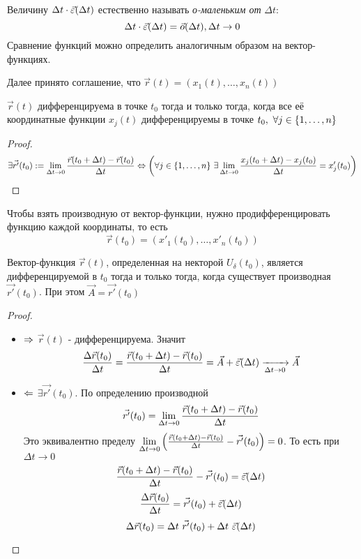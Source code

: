 \begin{note}
	Величину $\Delta t \cdot \vec{\varepsilon}(\Delta t)$ естественно называть \textit{о-маленьким от} $\Delta t$:
	\[
	\Delta t \cdot \vec{\varepsilon}(\Delta t) = \vec{o}(\Delta t), \Delta t \to 0
	\]
	Сравнение функций можно определить аналогичным образом на вектор-функциях.
\end{note}

\begin{note}
	Далее принято соглашение, что
	$\vec{r}(t) = (x_1(t), \ldots, x_n(t))$
\end{note}

\begin{lemma}
	$\vec{r}(t)$ дифференцируема в точке $t_0$
	тогда и только тогда, когда все её координатные
	функции $x_j(t)$ дифференцируемы в точке $t_0,\ 
	\forall j \in \range{n}$
\end{lemma}

\begin{proof}
	\[
		\exists \vec{r'}(t_0) := \lim\limits_{\Delta t \to 0}
		\frac{\vec{r}(t_0 + \Delta t) - \vec{r}(t_0)}{\Delta t}
		\Leftrightarrow \left(\forall j \in \{1, \ldots, n\}\ \exists
		\lim\limits_{\Delta t \to 0} \frac{x_j(t_0 + \Delta t) -
		x_j(t_0)}{\Delta t} = x'_j(t_0)\right)
	\]
\end{proof}

\begin{corollary}
	Чтобы взять производную от вектор-функции, нужно продифференцировать функцию каждой координаты, то есть
	\[
		\vec{r}(t_0) = (x'_1(t_0), \ldots, x'_n(t_0))
	\]
\end{corollary}

\begin{lemma}
	Вектор-функция $\vec{r}(t)$, определенная
	на некторой $U_\delta(t_0)$, является дифференцируемой
	в $t_0$ тогда и только тогда,
	когда существует производная $\vec{r'}(t_0)$.
	При этом $\vec{A} = \vec{r'}(t_0)$
\end{lemma}

\begin{proof}~
\begin{itemize}
	\item $\Rightarrow$ $\vec{r}(t)$ - дифференцируема. Значит
	\[
		\frac{\Delta\vec{r}(t_0)}{\Delta t} = \frac{\vec{r}(t_0 + \Delta t) - \vec{r}(t_0)}{\Delta t} = \vec{A} + \vec{\varepsilon}(\Delta t) \xrightarrow[\Delta t \to 0]{} \vec{A}
	\]
	
	\item $\Leftarrow$ $\exists \vec{r'}(t_0)$. По определению производной
	\[
		\vec{r'}(t_0) = \lim\limits_{\Delta t \to 0} \frac{\vec{r}(t_0 + \Delta t) - \vec{r}(t_0)}{\Delta t}
	\]
	Это эквивалентно пределу $\lim\limits_{\Delta t \to 0} \left(\frac{\vec{r}(t_0 + \Delta t) - \vec{r}(t_0)}{\Delta t} - \vec{r'}(t_0)\right) = 0$. То есть при $\Delta t \to 0$
	\[
		\frac{\vec{r}(t_0 + \Delta t) - \vec{r}(t_0)}{\Delta t} - \vec{r'}(t_0) = \vec{\varepsilon}(\Delta t)
	\]
	\[
		\frac{\Delta \vec{r}(t_0)}{\Delta t} = \vec{r'}(t_0) + \vec{\varepsilon}(\Delta t)
	\]
	\[
	\Delta \vec{r}(t_0) = \Delta t\ \vec{r'}(t_0) + \Delta t\ \vec{\varepsilon}(\Delta t)
	\]
\end{itemize}
\end{proof}

